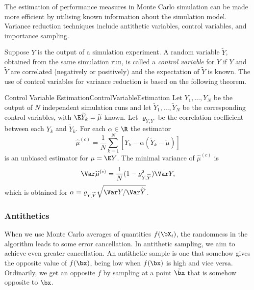 The estimation of performance measures in Monte Carlo simulation can be made more efficient by utilising known information about the simulation model. Variance reduction techniques include antithetic variables, control variables, and importance sampling.

Suppose \(Y\) is the output of a simulation experiment. A random variable \(\widetilde{Y}\), obtained from the same simulation run, is called a \textit{control variable} for \(Y\) if \(Y\) and \(\widetilde{Y}\) are correlated (negatively or positively) and the expectation of \(\widetilde{Y}\) is known. The use of control variables for variance reduction is based on the following theorem.

\begin{thm}{Control Variable Estimation}{ControlVariableEstimation}
	Let \(Y_1, \dots, Y_N\) be the output of \(N\) independent simulation runs and let \(\widetilde{Y}_1, \dots, \widetilde{Y}_N\) be the corresponding control variables, with \(\E \widetilde{Y}_k = \widetilde{\mu}\) known. Let \(\varrho_{Y, \widetilde{Y}}\) be the correlation coefficient between each \(Y_k\) and \(\widetilde{Y}_k\). For each \(\alpha \in \R\) the estimator
	\begin{equation} \label{eq:ControlVariateEstimator}
		\widehat{\mu}^{(c)} = \frac{1}{N} \sum_{k=1}^N \left[ Y_k - \alpha \left( \widetilde{Y}_k - \widetilde{\mu} \right) \right]
	\end{equation}
	is an unbiased estimator for \(\mu = \E Y\). The minimal variance of \(\widehat{\mu}^{(c)}\) is
	\begin{equation} \label{eq:MinimalVarianceControlVariate}
		\Var \widehat{\mu}^{(c)} = \frac{1}{N} (1 - \varrho_{Y, \widetilde{Y}}^2) \Var Y,
	\end{equation}
	which is obtained for \(\alpha = \varrho_{Y, \widetilde{Y}} \sqrt{\Var Y / \Var \widetilde{Y}}\).
\end{thm}

\subsubsection{Antithetics}
When we use Monte Carlo averages of quantities \(f(\bX_i)\), the randomness in the algorithm leads to some error cancellation. In antithetic sampling, we aim to achieve even greater cancellation. An antithetic sample is one that somehow gives the opposite value of \(f(\bx)\), being low when \(f(\bx)\) is high and vice versa. Ordinarily, we get an opposite \(f\) by sampling at a point \(\tilde{\bx}\) that is somehow opposite to \(\bx\).

